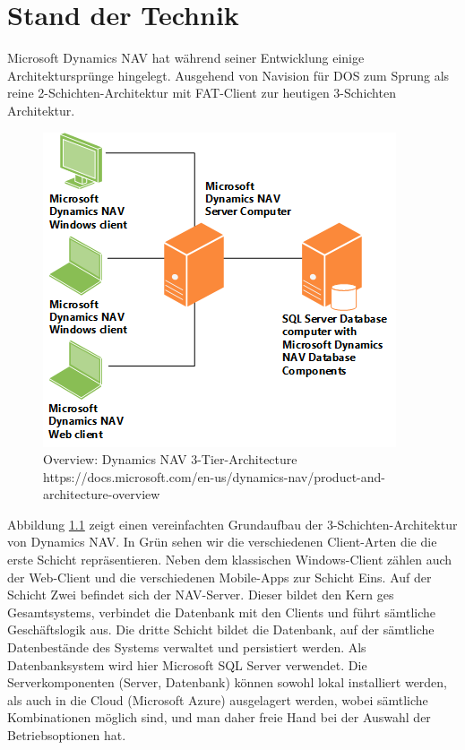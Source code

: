 \chapter{Stand der Technik}
\label{cha:standdertechnik}
Microsoft Dynamics NAV hat während seiner Entwicklung einige Architektursprünge hingelegt. Ausgehend von Navision für DOS zum Sprung als reine 2-Schichten-Architektur mit FAT-Client zur heutigen 3-Schichten Architektur. \cite{Sah2016}
\begin{figure}[h]
	\centering\small
	\includegraphics{images/nav_roletailoredarchitecture.png}
	\caption{Overview: Dynamics NAV 3-Tier-Architecture https://docs.microsoft.com/en-us/dynamics-nav/product-and-architecture-overview}
	\label{fig:Image3TierArchitecture}
\end{figure}

Abbildung \ref{fig:Image3TierArchitecture} zeigt einen vereinfachten Grundaufbau der 3-Schichten-Architektur von Dynamics NAV. In Grün sehen wir die verschiedenen Client-Arten die die erste Schicht repräsentieren. Neben dem klassischen Windows-Client zählen auch der Web-Client und die verschiedenen Mobile-Apps zur Schicht Eins. Auf der Schicht Zwei befindet sich der NAV-Server. Dieser bildet den Kern ges Gesamtsystems, verbindet die Datenbank mit den Clients und führt sämtliche Geschäftslogik aus. Die dritte Schicht bildet die Datenbank, auf der sämtliche Datenbestände des Systems verwaltet und persistiert werden. Als Datenbanksystem wird hier Microsoft SQL Server verwendet. 
 Die Serverkomponenten (Server, Datenbank) können sowohl lokal installiert werden, als auch in die Cloud (Microsoft Azure) ausgelagert werden, wobei sämtliche Kombinationen möglich sind, und man daher freie Hand bei der Auswahl der Betriebsoptionen hat.
